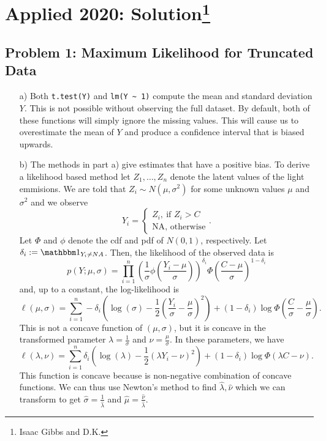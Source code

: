 \section{Applied 2020: Solution\footnote{Isaac Gibbs and D.K.}}

\subsection*{Problem 1: Maximum Likelihood for Truncated Data}

\begin{enumerate}
\item[a)]
Both \verb|t.test(Y)| and \verb|lm(Y ~ 1)| compute the mean and standard deviation $Y$. This is not possible without observing the full dataset. By default, both of these functions will simply ignore the missing values. This will cause us to overestimate the mean of $Y$ and produce a confidence interval that is biased upwards.
\item[b)]
The methods in part a) give estimates that have a positive bias. To derive a likelihood based method let $Z_1,\dots,Z_n$ denote the latent values of the light emmisions. We are told that $Z_i \sim N(\mu,\sigma^2)$ for some unknown values $\mu$ and $\sigma^2$ and  we observe 
\[
Y_i = \begin{cases}
Z_i, \ \text{if } Z_i > C\\
\text{NA}, \text{ otherwise}
\end{cases}.
\] 
Let $\Phi$ and $\phi$ denote the cdf and pdf of $N(0,1)$, respectively. Let $\delta_i := \bone_{Y_i \neq NA}$. Then, the likelihood of the observed data is 
\[
p(Y;\mu,\sigma) = \prod_{i=1}^n \left( \frac{1}{\sigma} \phi\left( \frac{Y_i - \mu}{\sigma} \right) \right)^{\delta_i } \Phi\left( \frac{C - \mu}{\sigma} \right)^{1 - \delta_i} 
\]
and, up  to a constant, the log-likelihood is
\[\ell(\mu,\sigma) = \sum_{i=1}^n -\delta_i\left(\log(\sigma) -\frac{1}{2}\left(\frac{Y_i}{\sigma}-\frac{\mu}{\sigma}\right)^2\right) + (1-\delta_i)\log \Phi\left(\frac{C}{\sigma}-\frac{\mu}{\sigma}\right). \]
This is not a concave function of $(\mu,\sigma)$, but it is concave in the transformed parameter $\lambda = \frac{1}{\sigma}$ and $\nu = \frac{\mu}{\sigma}$. In these parameters, we have
\[\ell(\lambda,\nu) =\sum_{i=1}^n \delta_i\left(\log(\lambda) -\frac{1}{2}\left(\lambda Y_i-\nu\right)^2\right) + (1-\delta_i)\log \Phi\left(\lambda C-\nu\right). \]
This function is concave because is non-negative combination of concave functions. We can thus use Newton's method to find $\hat{\lambda},\hat{\nu}$ which we can transform to get $\hat{\sigma} = \frac{1}{\hat{\lambda}}$ and $\hat{\mu} = \frac{\hat{\nu}}{\hat{\lambda}}$.



\end{enumerate}
